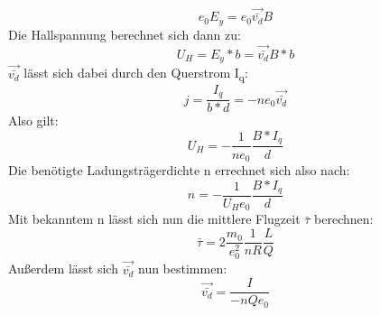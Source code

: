 \documentclass[titlepage=firstcover, captions=tableheading]{scrartcl}
\begin{document}
\begin{equation}
    e_0E_y=e_0\vec{\bar{v_d}}B
\end{equation}
Die Hallspannung berechnet sich dann zu:
\begin{equation}
    U_H=E_y*b=\vec{\bar{v_d}}B*b
\end{equation}
$\vec{\bar{v_d}}$ lässt sich dabei durch den Querstrom I\textsubscript{q}:
\begin{equation}
    j=\frac{I_q}{b*d}=-ne_0\vec{\bar{v_d}}
\end{equation}
Also gilt:
\begin{equation}
    U_H=-\frac{1}{ne_0}\frac{B*I_q}{d}
\end{equation}
Die benötigte Ladungsträgerdichte n errechnet sich also nach:
\begin{equation}\label{Ladungsträger n}
    n=-\frac{1}{U_He_0}\frac{B*I_q}{d} 
\end{equation}
Mit bekanntem n lässt sich nun die mittlere Flugzeit $\bar{\tau}$ berechnen:
\begin{equation}
    \bar{\tau}=2\frac{m_0}{e_0^2}\frac{1}{nR}\frac{L}{Q}
\end{equation}
Außerdem lässt sich $\vec{\bar{v_d}}$ nun bestimmen:
\begin{equation}
    \vec{\bar{v_d}}=\frac{I}{-nQe_0}
\end{equation}
\end{document}

